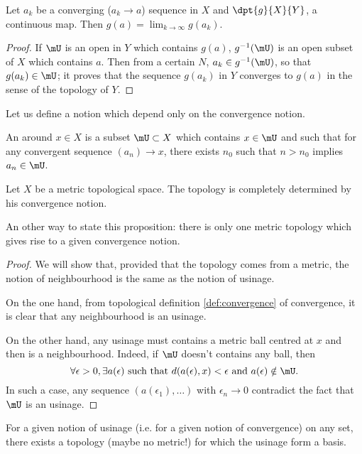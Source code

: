 \begin{proposition}
Let $a_k$ be a converging ($a_k\to a$) sequence in $X$ and $\dpt{g}{X}{Y}$, a continuous map. Then $g(a)=\lim_{k\to\infty}g(a_k)$.
\label{prop:continu_cv}
\end{proposition}
\begin{proof}
If $\mU$ is an open in $Y$ which contains $g(a)$, $g^{-1}(\mU)$ is an open subset of $X$ which contains $a$. Then from a certain $N$, $a_k\in g^{-1}(\mU)$, so that $g(a_k)\in\mU$; it proves that the sequence $g(a_k)$ in $Y$ converges to $g(a)$ in the sense of the topology of $Y$.
\end{proof}

Let us define a notion which depend only on the convergence notion. 

\begin{definition}
An  around $x\in X$ is a subset $\mU\subset X$ which contains $x\in\mU$ and such that for any convergent sequence $(a_n)\to x$, there exists $n_0$ such that $n>n_0$ implies $a_n\in\mU$.
\end{definition}

\begin{lemma}
Let $X$ be a metric topological space. The topology is completely determined by his convergence notion.

An other way to state this proposition: there is only one metric topology which gives rise to a given convergence notion. \label{prop:usinage}
\end{lemma}
\begin{proof}
We will show that, provided that the topology comes from a metric, the notion of neighbourhood is the same as the notion of usinage.

On the one hand, from topological definition \ref{def:convergence} of convergence, it is clear that any neighbourhood is an usinage.

On the other hand, any usinage must contains a metric ball centred at $x$ and then is a neighbourhood. Indeed, if $\mU$ doesn't contains any ball, then
\[
 \forall\epsilon>0,\exists a(\epsilon)\text{ such that } d(a(\epsilon),x)<\epsilon \text{ and } a(\epsilon)\notin\mU.
\]
%
In such a case, any sequence $( a(\epsilon_1),\ldots )$ with $\epsilon_n\to 0$ contradict the fact that $\mU$ is an usinage.
\end{proof}

\begin{proposition}
For a given notion of usinage (i.e. for a given notion of convergence) on any set, there exists a topology (maybe no metric!) for which the usinage form a basis.
\end{proposition}

